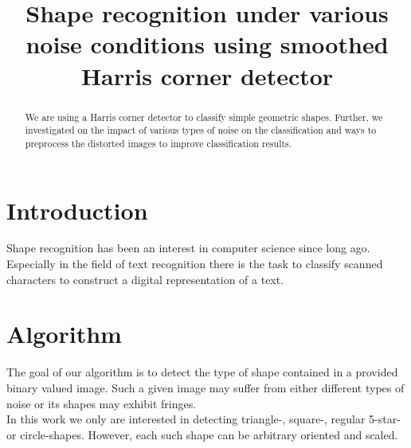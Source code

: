 \documentclass[conference]{IEEEtran}
\begin{document}
%
\title{Shape recognition under various noise conditions using smoothed Harris corner detector}


\author{
\and
{}
}


\maketitle


\begin{abstract}
We are using a Harris corner detector\cite{Harris88acombined} 
to classify simple geometric shapes. Further, we 
investigated on the impact of various types of noise on the classification and ways
to preprocess the distorted images to improve classification results.
\end{abstract}

\section{Introduction}
Shape recognition has been an interest in computer science since long ago. Especially in the
field of text recognition there is the task to classify scanned characters to construct 
a digital representation of a text.

\section{Algorithm}
The goal of our algorithm is to detect the type of shape contained in a provided binary valued image. 
Such a given image may suffer from either different types of noise or its shapes may exhibit fringes. \\


In this work we only are interested in detecting triangle-, square-, regular 5-star- or circle-shapes. However, each such shape can be arbitrary oriented and scaled. \\
\end{document}
